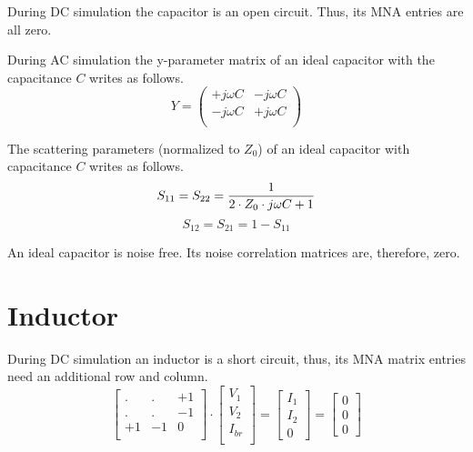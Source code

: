 During DC simulation the capacitor is an open circuit. Thus, its MNA
entries are all zero.

\addvspace{12pt}

During AC simulation the y-parameter matrix of an ideal capacitor
with the capacitance $C$ writes as follows.
\begin{equation}
Y =
\begin{pmatrix}
+j\omega C & -j\omega C\\
-j\omega C & +j\omega C\\
\end{pmatrix}
\end{equation}

The scattering parameters (normalized to $Z_0$) of an ideal capacitor
with capacitance $C$ writes as follows.
\begin{equation}
S_{11} = S_{22} = \frac{1}{2\cdot Z_0\cdot j\omega C+1} \\
\end{equation}
\begin{equation}
S_{12} = S_{21} = 1-S_{11}
\end{equation}

An ideal capacitor is noise free. Its noise correlation matrices
are, therefore, zero.


\section{Inductor}

During DC simulation an inductor is a short circuit, thus, its
MNA matrix entries need an additional row and column.
\begin{equation}
\begin{bmatrix}
. & . & +1\\
. & . & -1\\
+1 & -1 & 0\\
\end{bmatrix}
\cdot
\begin{bmatrix}
V_1\\
V_2\\
I_{br}\\
\end{bmatrix}
=
\begin{bmatrix}
I_1\\
I_2\\
0
\end{bmatrix}
=
\begin{bmatrix}
0\\
0\\
0
\end{bmatrix}
\end{equation}

